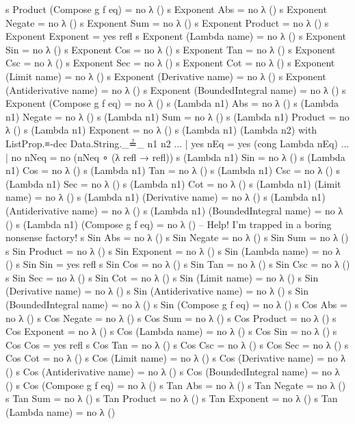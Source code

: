 \documentclass{report}
\begin{document}
\begin{code}
    s Product (Compose g f eq) = no λ ()
    s Exponent Abs = no λ ()
    s Exponent Negate = no λ ()
    s Exponent Sum = no λ ()
    s Exponent Product = no λ ()
    s Exponent Exponent = yes refl
    s Exponent (Lambda name) = no λ ()
    s Exponent Sin = no λ ()
    s Exponent Cos = no λ ()
    s Exponent Tan = no λ ()
    s Exponent Csc = no λ ()
    s Exponent Sec = no λ ()
    s Exponent Cot = no λ ()
    s Exponent (Limit name) = no λ ()
    s Exponent (Derivative name) = no λ ()
    s Exponent (Antiderivative name) = no λ ()
    s Exponent (BoundedIntegral name) = no λ ()
    s Exponent (Compose g f eq) = no λ ()
    s (Lambda n1) Abs = no λ ()
    s (Lambda n1) Negate = no λ ()
    s (Lambda n1) Sum = no λ ()
    s (Lambda n1) Product = no λ ()
    s (Lambda n1) Exponent = no λ ()
    s (Lambda n1) (Lambda n2) with ListProp.≡-dec Data.String._≟_ n1 n2
    ... | yes nEq = yes (cong Lambda nEq)
    ... | no nNeq = no (nNeq ∘ (λ {refl → refl}))
    s (Lambda n1) Sin = no λ ()
    s (Lambda n1) Cos = no λ ()
    s (Lambda n1) Tan = no λ ()
    s (Lambda n1) Csc = no λ ()
    s (Lambda n1) Sec = no λ ()
    s (Lambda n1) Cot = no λ ()
    s (Lambda n1) (Limit name) = no λ ()
    s (Lambda n1) (Derivative name) = no λ ()
    s (Lambda n1) (Antiderivative name) = no λ ()
    s (Lambda n1) (BoundedIntegral name) = no λ ()
    s (Lambda n1) (Compose g f eq) = no λ ()
    -- Help!  I'm trapped in a boring nonsense factory!
    s Sin Abs = no λ ()
    s Sin Negate = no λ ()
    s Sin Sum = no λ ()
    s Sin Product = no λ ()
    s Sin Exponent = no λ ()
    s Sin (Lambda name) = no λ ()
    s Sin Sin = yes refl
    s Sin Cos = no λ ()
    s Sin Tan = no λ ()
    s Sin Csc = no λ ()
    s Sin Sec = no λ ()
    s Sin Cot = no λ ()
    s Sin (Limit name) = no λ ()
    s Sin (Derivative name) = no λ ()
    s Sin (Antiderivative name) = no λ ()
    s Sin (BoundedIntegral name) = no λ ()
    s Sin (Compose g f eq) = no λ ()
    s Cos Abs = no λ ()
    s Cos Negate = no λ ()
    s Cos Sum = no λ ()
    s Cos Product = no λ ()
    s Cos Exponent = no λ ()
    s Cos (Lambda name) = no λ ()
    s Cos Sin = no λ ()
    s Cos Cos = yes refl
    s Cos Tan = no λ ()
    s Cos Csc = no λ ()
    s Cos Sec = no λ ()
    s Cos Cot = no λ ()
    s Cos (Limit name) = no λ ()
    s Cos (Derivative name) = no λ ()
    s Cos (Antiderivative name) = no λ ()
    s Cos (BoundedIntegral name) = no λ ()
    s Cos (Compose g f eq) = no λ ()
    s Tan Abs = no λ ()
    s Tan Negate = no λ ()
    s Tan Sum = no λ ()
    s Tan Product = no λ ()
    s Tan Exponent = no λ ()
    s Tan (Lambda name) = no λ ()

\end{code}
\end{document}
